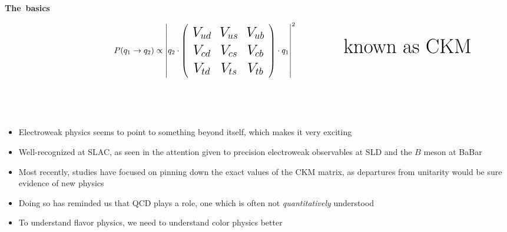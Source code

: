 \documentclass[landscape]{article}
\newenvironment{slide}[1][ ]{\mbox{\bf \boldmath #1 } \vfill}{\vfill \vspace{-1.5 cm} \mbox{ } \pagebreak}
\newenvironment{itemizer}[1]{\begin{itemize}\setlength{\itemsep}{#1}}{\end{itemize}}
\begin{document}
\begin{slide}[The basics]
\begin{itemizer}{0.5 cm}
\begin{itemizer}{0.5 cm}
\[ \LARGE \hspace{3 cm} P(q_1 \to q_2) \propto \left| q_2 \cdot \left(\begin{array}{c c c} V_{ud} & V_{us} & V_{ub} \\ V_{cd} & V_{cs} & V_{cb} \\ V_{td} & V_{ts} & V_{tb} \end{array} \right) \cdot q_1 \right|^2 \hspace{2 cm} \mbox{\Huge known as CKM} \]

    \end{itemizer}

\end{itemizer}

\end{slide}

\begin{slide}

\begin{itemizer}{1 cm}

  \item Electroweak physics seems to point to something beyond itself,
  which makes it very exciting

  \item Well-recognized at SLAC, as seen in the attention given to
  precision electroweak observables at SLD and the $B$ meson at BaBar

  \item Most recently, studies have focused on pinning down the exact
  values of the CKM matrix, as departures from unitarity would be sure
  evidence of new physics

  \item Doing so has reminded us that QCD plays a role, one which is
  often not {\it quantitatively} understood

  \item To understand flavor physics, we need to understand color
  physics better

\end{itemizer}

\vspace{1 cm}

\end{slide}
\end{document}
